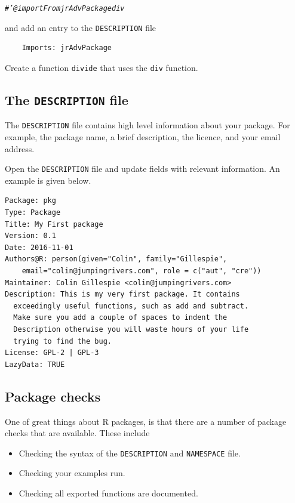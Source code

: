 \documentclass[a4paper,justified,openany]{tufte-handout}\usepackage[]{graphicx}\usepackage[]{color}
\makeatletter
\newcommand{\hlcom}[1]{\textcolor[rgb]{0.678,0.584,0.686}{\textit{#1}}}%
\newenvironment{kframe}{%
 \def\at@end@of@kframe{}%
 \ifinner\ifhmode%
  \def\at@end@of@kframe{\end{minipage}}%
  \begin{minipage}{\columnwidth}%
 \fi\fi%
 \def\FrameCommand##1{\hskip\@totalleftmargin \hskip-\fboxsep
 \colorbox{shadecolor}{##1}\hskip-\fboxsep
     \hskip-\linewidth \hskip-\@totalleftmargin \hskip\columnwidth}%
 \MakeFramed {\advance\hsize-\width
   \@totalleftmargin\z@ \linewidth\hsize
   \@setminipage}}%
 {\par\unskip\endMakeFramed%
 \at@end@of@kframe}
\newenvironment{knitrout}{}{} %
\newcommand{\cc}{\texttt}
\makeatother
\begin{document}
\begin{enumerate}
\begin{knitrout}
\color{fgcolor}\begin{kframe}
\begin{alltt}
\hlcom{#' @importFrom jrAdvPackage div}
\end{alltt}
\end{kframe}
\end{knitrout}

\noindent and add an entry to the \cc{DESCRIPTION} file
\begin{verbatim}
    Imports: jrAdvPackage
\end{verbatim}
Create a function \cc{divide} that uses the \cc{div} function.
\end{enumerate}


\subsection{The \cc{DESCRIPTION} file}

The \cc{DESCRIPTION} file contains high level information about your package.
For example, the package name, a brief description, the licence, and your email
address.

Open the \cc{DESCRIPTION} file and update fields with relevant information. An
example is given below.
\begin{verbatim}
Package: pkg
Type: Package
Title: My First package
Version: 0.1
Date: 2016-11-01
Authors@R: person(given="Colin", family="Gillespie",
    email="colin@jumpingrivers.com", role = c("aut", "cre"))
Maintainer: Colin Gillespie <colin@jumpingrivers.com>
Description: This is my very first package. It contains
  exceedingly useful functions, such as add and subtract.
  Make sure you add a couple of spaces to indent the
  Description otherwise you will waste hours of your life
  trying to find the bug.
License: GPL-2 | GPL-3
LazyData: TRUE
\end{verbatim}

\subsection{Package checks}

One of great things about R packages, is that there are a number of package
checks that are available. These include
\begin{itemize}
\item Checking the syntax of the \cc{DESCRIPTION} and \cc{NAMESPACE} file.
\item Checking your examples run.
\item Checking all exported functions are documented.
\end{itemize}
\end{document}
